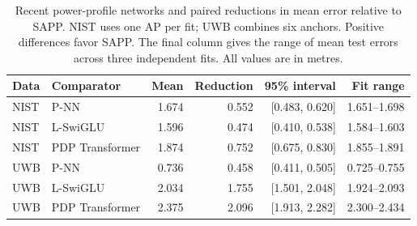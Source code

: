 \begin{table}[ht]
\centering\small
\caption{Recent power-profile networks and paired reductions in mean error relative to SAPP. NIST uses one AP per fit; UWB combines six anchors. Positive differences favor SAPP. The final column gives the range of mean test errors across three independent fits. All values are in metres.}
\label{tab:recentpaired}
\begin{tabular}{llrrrr}
\toprule
Data & Comparator & Mean & Reduction & 95\% interval & Fit range\\
\midrule
NIST & P-NN & 1.674 & 0.552 & [0.483, 0.620] & 1.651--1.698\\
NIST & L-SwiGLU & 1.596 & 0.474 & [0.410, 0.538] & 1.584--1.603\\
NIST & PDP Transformer & 1.874 & 0.752 & [0.675, 0.830] & 1.855--1.891\\
UWB & P-NN & 0.736 & 0.458 & [0.411, 0.505] & 0.725--0.755\\
UWB & L-SwiGLU & 2.034 & 1.755 & [1.501, 2.048] & 1.924--2.093\\
UWB & PDP Transformer & 2.375 & 2.096 & [1.913, 2.282] & 2.300--2.434\\
\bottomrule
\end{tabular}
\end{table}
